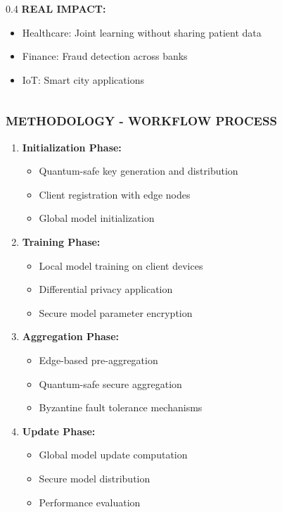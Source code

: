 \documentclass[aspectratio=169]{beamer}
\begin{document}
\begin{frame}
\begin{columns}
\begin{column}{0.4\textwidth}
            \textbf{REAL IMPACT:}
            \begin{itemize}
                \item Healthcare: Joint learning without sharing patient data
                \item Finance: Fraud detection across banks
                \item IoT: Smart city applications
            \end{itemize}
        \end{column}
    \end{columns}
\end{frame}

\begin{frame}
    \frametitle{METHODOLOGY - WORKFLOW PROCESS}
    \begin{enumerate}
        \item \textbf{Initialization Phase:}
        \begin{itemize}
            \item Quantum-safe key generation and distribution
            \item Client registration with edge nodes
            \item Global model initialization
        \end{itemize}
        
        \item \textbf{Training Phase:}
        \begin{itemize}
            \item Local model training on client devices
            \item Differential privacy application
            \item Secure model parameter encryption
        \end{itemize}
        
        \item \textbf{Aggregation Phase:}
        \begin{itemize}
            \item Edge-based pre-aggregation
            \item Quantum-safe secure aggregation
            \item Byzantine fault tolerance mechanisms
        \end{itemize}
        
        \item \textbf{Update Phase:}
        \begin{itemize}
            \item Global model update computation
            \item Secure model distribution
            \item Performance evaluation
        \end{itemize}
    \end{enumerate}
\end{frame}
\end{document}
